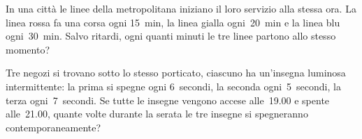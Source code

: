 
\begin{multicols}{2}

% 

\begin{esercizio}
\label{ese:1.45}
In una città le linee della metropolitana iniziano il loro servizio alla stessa 
ora. La linea rossa fa una corsa ogni 15~min, la linea gialla ogni~20~min 
e la linea blu ogni~30~min. Salvo ritardi, ogni quanti minuti le tre linee
partono allo stesso momento?
\end{esercizio}

\begin{esercizio}
\label{ese:1.46}
 Tre negozi si trovano sotto lo stesso porticato, ciascuno ha un'insegna luminosa intermittente: la prima si spegne ogni
6~secondi, la seconda ogni~5~secondi, la terza ogni~7~secondi. Se tutte le 
insegne vengono accese alle~19.00 e spente alle~21.00, quante 
volte durante la serata le tre insegne si spegneranno contemporaneamente?
\end{esercizio}


\end{multicols}
